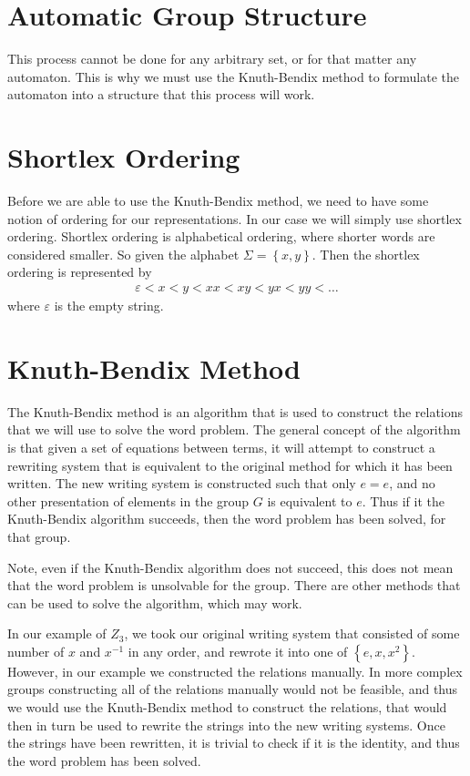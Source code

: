\documentclass[10pt]{amsart}
\theoremstyle{definition}
\begin{document}
\section{Automatic Group Structure}%
\label{sec:automatic_group_structure}

This process cannot be done for any arbitrary set, or for that matter any
automaton. This is why we must use the Knuth-Bendix method to formulate the
automaton into a structure that this process will work.

\section{Shortlex Ordering}%
\label{sec:shortlex_ordering}

Before we are able to use the Knuth-Bendix method, we need to have some notion
of ordering for our representations. In our case we will simply use shortlex
ordering. Shortlex ordering is alphabetical ordering, where shorter words are
considered smaller. So given the alphabet $\Sigma=\left\{x,y\right\}$. Then the
shortlex ordering is represented by
\begin{align*}
  \varepsilon<x<y<xx<xy<yx<yy<\ldots
\end{align*}
where $\varepsilon$ is the empty string.

\section{Knuth-Bendix Method}%
\label{sec:kunth_bendix_method}

The Knuth-Bendix method is an algorithm that is used to construct the relations
that we will use to solve the word problem. The general concept of the
algorithm is that given a set of equations between terms, it will attempt to
construct a rewriting system that is equivalent to the original method for
which it has been written. The new writing system is constructed such that only
$e=e$, and no other presentation of elements in the group $G$ is equivalent to
$e$. Thus if it the Knuth-Bendix algorithm succeeds, then the word problem has
been solved, for that group.

Note, even if the Knuth-Bendix algorithm does not succeed, this does not mean
that the word problem is unsolvable for the group. There are other methods that
can be used to solve the algorithm, which may work.

In our example of $Z_3$, we took our original writing system that consisted of
some number of $x$ and $x^{-1}$ in any order, and rewrote it into one of
$\left\{e, x, x^2\right\}$. However, in our example we constructed the
relations manually. In more complex groups constructing all of the relations
manually would not be feasible, and thus we would use the Knuth-Bendix method
to construct the relations, that would then in turn be used to rewrite the
strings into the new writing systems. Once the strings have been rewritten, it
is trivial to check if it is the identity, and thus the word problem has been
solved.
\end{document}
